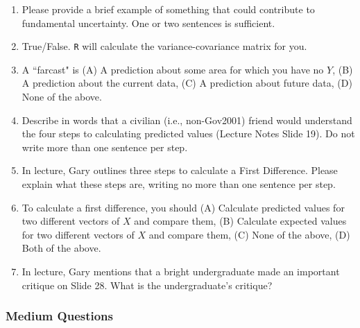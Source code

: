 \documentclass[11pt]{article}
\begin{document}
\begin{enumerate}
\item Please provide a brief example of something that could contribute to fundamental uncertainty. One or two sentences is sufficient. 
\item True/False.  \texttt{R} will calculate the variance-covariance matrix for you. 
\item A ``farcast" is (A) A prediction about some area for which you have no $Y$, (B) A prediction about the current data, (C) A prediction about future data, (D) None of the above. 
\item Describe in words that a civilian (i.e., non-Gov2001) friend would understand the four steps to calculating predicted values (Lecture Notes Slide 19). Do not write more than one sentence per step. 
\item In lecture, Gary outlines three steps to calculate a First Difference. Please explain what these steps are, writing no more than one sentence per step. 
\item To calculate a first difference, you should (A) Calculate predicted values for two different vectors of $X$ and compare them, (B) Calculate expected values for two different vectors of $X$ and compare them, (C) None of the above, (D) Both of the above.
\item In lecture, Gary mentions that a bright undergraduate made an important critique on Slide 28.  What is the undergraduate's critique? 
\end{enumerate}

\subsubsection{Medium Questions}
\end{document}
